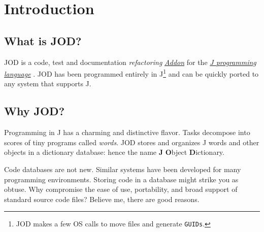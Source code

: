    \section{Introduction}
   
   \subsection{What is JOD?}
   
   JOD is a code, test and documentation \emph{refactoring} \href{https://www.jsoftware.com/jwiki/Addons}{\emph{Addon}} for the
     \href{https://www.jsoftware.com}{\emph{J programming language}} \cite{RKWHui:jdictionary} \cite{jwiki:nuvoc}. JOD has been 
      programmed entirely in J\footnote{JOD makes a few OS calls to move files and generate \texttt{GUIDs}.}
      and can be quickly ported to any system that supports J.
   
   \subsection{Why JOD?}  
   
   Programming in J 
   has a charming and distinctive flavor.  Tasks decompose into scores of tiny
   programs called \emph{words}. JOD stores and organizes
   J words and other objects in a dictionary database: hence the 
   name \textbf{J} \textbf{O}bject \textbf{D}ictionary.
   
   Code  databases are not new.  Similar systems have 
   been developed for many programming
   environments. Storing code in a database might strike you as obtuse.  
   Why compromise the ease of use, portability, and broad support of standard source code  
   files? Believe me,
   there are good reasons.
   
